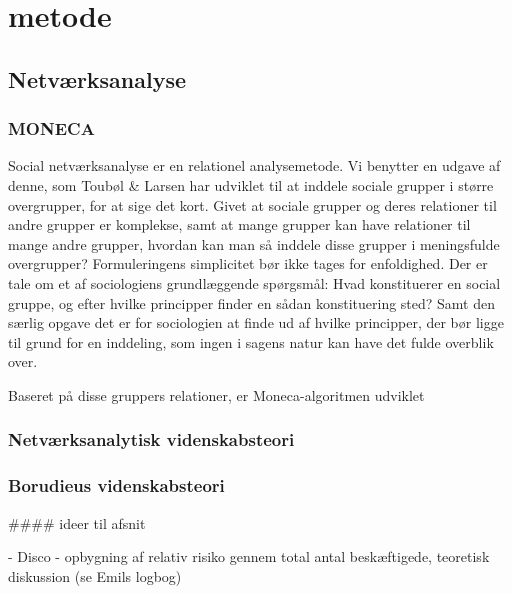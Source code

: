 
\chapter{metode} \label{metode}



\section{Netværksanalyse \label{}}




\subsection{MONECA}

Social netværksanalyse er en relationel analysemetode. Vi benytter en udgave af denne, som Toubøl \& Larsen har udviklet til at inddele sociale grupper i større overgrupper, for at sige det kort. Givet at sociale grupper og deres relationer til andre grupper er komplekse, samt at mange grupper kan have relationer til mange andre grupper, hvordan kan man så inddele disse grupper i meningsfulde overgrupper? Formuleringens simplicitet bør ikke tages for enfoldighed. Der er tale om et af sociologiens grundlæggende spørgsmål: Hvad konstituerer en social gruppe, og efter hvilke principper finder en sådan konstituering sted? Samt den særlig opgave det er for sociologien at finde ud af hvilke principper, der bør ligge til grund for en inddeling, som ingen i sagens natur kan have det fulde overblik over. 




Baseret på disse gruppers relationer, er Moneca-algoritmen udviklet 





\subsection{Netværksanalytisk videnskabsteori}


\subsection{Borudieus videnskabsteori}








#### ideer til afsnit

- Disco
- opbygning af relativ risiko gennem total antal beskæftigede, teoretisk diskussion (se Emils logbog)















